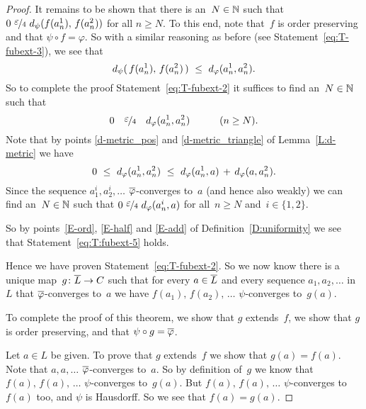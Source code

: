 \documentclass[main.tex]{subfiles}
\begin{document}
\begin{proof}
It remains to be shown that there is an~$N\in \mathbb{N}$
such that 
$0\  \smash{\nicefrac{\textstyle{\varepsilon}}{4}} \  d_{\smash{\psi}}(f(a^1_n),\,f(a^2_n))$
for all $n\geq N$.
To this end, note that~$f$ is order preserving
and that $\psi \circ f = \varphi$.
So with a similar reasoning as before (see Statement~\eqref{eq:T-fubext-3}),
we see that
\begin{equation*}
\ld\psi(\,f(a^1_n),\,f(a^2_n)\,)
\ \leq\ 
\ld\varphi(a^1_n, a^2_n).
\end{equation*}
So to complete the proof Statement~\eqref{eq:T-fubext-2}
it suffices to find an~$N\in\mathbb{N}$ such that 
\begin{equation}
\label{eq:T:fubext-5}
0\quad\smash{\nicefrac{\textstyle{\varepsilon}}{4}}\quad d_{\smash{\varphi}}(a^1_n, a^2_n)
\qquad\quad(n\geq N).
\end{equation}
Note that
by
points \ref{d-metric_pos}
and \ref{d-metric_triangle}
of Lemma~\ref{L:d-metric}
we have
\begin{equation*}
0\ \leq\ 
\ld\varphi(a_n^1,a_n^2) 
\ \leq\ 
\ld\varphi(a_n^1,a)
\,+\,
\ld\varphi(a,a_n^2).
\end{equation*}
Since the sequence $a^i_1,a^i_2,\dotsc$
$\overline\varphi$-converges to~$a$
(and hence also weakly)
we can find an~$N\in\mathbb{N}$
such that $0\ \smash{\nicefrac{\textstyle{\varepsilon}}{4}} \ d_{\smash{\varphi}}(a_n^i,a)$
 for all~$n\geq N$ and~$i\in\{1,2\}$.

So by points~\ref{E-ord}, \ref{E-half} and \ref{E-add}
of Definition~\ref{D:uniformity}
we see that Statement~\eqref{eq:T:fubext-5} holds.

Hence we have proven Statement~\eqref{eq:T-fubext-2}.
So we now know there is a unique map~$g\colon \overline L \rightarrow C$
such that 
for every $a\in\overline L$
and every sequence $a_1,a_2,\dotsc$ in~$L$ that $\overline\varphi$-converges to~$a$
we have $f(a_1),\,f(a_2),\,\dotsc$ 
$\psi$-converges to~$g(a)$.

To complete the proof of this theorem,
we show that $g$ extends~$f$,
we show that $g$ is order preserving,
and that $\psi \circ g = \overline \varphi$.

Let $a\in L$ be given. To prove that $g$ extends~$f$
we show that $g(a)=f(a)$.
Note that $a,a,\dotsc$ $\overline\varphi$-converges to~$a$.
So by definition of~$g$ we know that $f(a),\,f(a),\,\dotsc$
$\psi$-converges to~$g(a)$.
But $f(a),\,f(a),\,\dotsc$ $\psi$-converges to~$f(a)$
too, and $\psi$ is Hausdorff.
So we see that $f(a)=g(a)$.


\end{proof}
\end{document}
